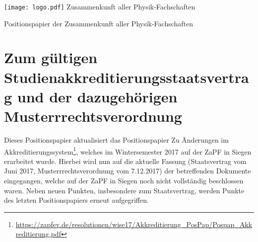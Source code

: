 \documentclass[DIV=calc]{scrartcl}
\begin{document}
    \hspace{0.87\textwidth}
     \begin{minipage}{120pt}
         \vspace{-1.8cm}
         \texttt{[image: logo.pdf]}
         \centering
        \small Zusammenkunft aller Physik-Fachschaften
    \end{minipage}
    \begin{center}
        \huge{Positionspapier der Zusammenkunft aller Physik-Fachschaften}\vspace{.25\baselineskip}\\
        \normalsize
    \end{center}
\section*{Zum gültigen Studienakkreditierungsstaatsvertrag und der dazugehörigen Musterrrechtsverordnung}
Dieses Positionspapier aktualisiert das Positionspapier \glqq Zu Änderungen im Akkreditierungssystem\grqq\footnote{\url{https://zapfev.de/resolutionen/wise17/Akkreditierung\_PosPap/Pospap\_Akkreditierung.pdf}}, welches im Wintersemester 2017 auf der ZaPF in Siegen erarbeitet wurde. Hierbei wird nun auf die aktuelle Fassung (Staatsvertrag vom Juni 2017, Musterrrechtsverordnung vom 7.12.2017) der betreffenden Dokumente eingegangen, welche auf der ZaPF in Siegen noch nicht vollständig beschlossen waren. Neben neuen Punkten, insbesondere zum Staatsvertrag, werden Punkte des letzten Positionspapiers erneut aufgegriffen.
\end{document}
